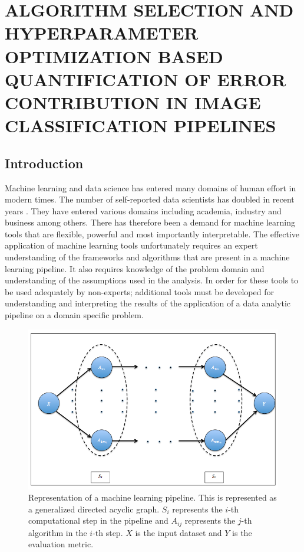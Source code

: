 \chapter{ALGORITHM SELECTION AND HYPERPARAMETER OPTIMIZATION BASED QUANTIFICATION OF ERROR CONTRIBUTION IN IMAGE CLASSIFICATION PIPELINES}
\label{chap:EP}

\let\thefootnote\relax\footnotetext{}


\section{Introduction} 
\label{sec1}
Machine learning and data science has entered many domains of human effort in modern times. The number of self-reported data scientists has doubled in recent years \cite{harrison1995validity}. They have entered various domains including academia, industry and business among others. There has therefore been a demand for machine learning tools that are flexible, powerful and most importantly interpretable. The effective application of machine learning tools unfortunately requires an expert understanding of the frameworks and algorithms that are present in a machine learning pipeline. It also requires knowledge of the problem domain and understanding of the assumptions used in the analysis. In order for these tools to be used adequately by non-experts; additional tools must be developed for understanding and interpreting the results of the application of a data analytic pipeline on a domain specific problem.  

\begin{figure}[ht!]
    \centering
    \includegraphics[scale=0.5]{img/EP/generalized_pipeline}
    \caption{Representation of a machine learning pipeline. This is represented as a generalized directed acyclic graph. $S_i$ represents the $i$-th computational step in the pipeline and $A_{ij}$ represents the $j$-th algorithm in the $i$-th step. $X$ is the input dataset and $Y$ is the evaluation metric.}
    \label{fig:pipeline}
\end{figure}

